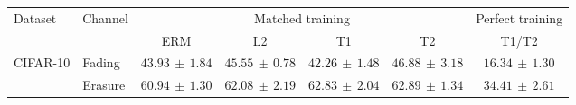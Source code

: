 \begin{tabular*}{\linewidth}{@{\extracolsep{\fill}}llccccc@{}}
\toprule
\multirow{2}{*}{Dataset} & \multirow{2}{*}{Channel} & \multicolumn{4}{c}{Matched training} & Perfect training \\
\cmidrule(lr){3-6}\cmidrule(l){7-7}
 & & ERM & L2 & T1 & T2 & T1/T2 \\
\midrule
\multirow{2}{*}{CIFAR-10} & Fading & $43.93\,\pm\,1.84$ & $45.55\,\pm\,0.78$ & $42.26\,\pm\,1.48$ & $\mathbf{46.88}\,\pm\,3.18$ & $16.34\,\pm\,1.30$ \\
 & Erasure & $60.94\,\pm\,1.30$ & $62.08\,\pm\,2.19$ & $62.83\,\pm\,2.04$ & $\mathbf{62.89}\,\pm\,1.34$ & $34.41\,\pm\,2.61$ \\
\bottomrule
\end{tabular*}
